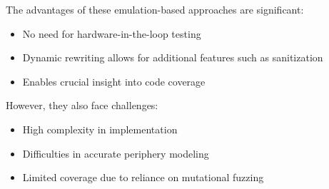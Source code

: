 The advantages of these emulation-based approaches are significant:
\begin{itemize}
  \item No need for hardware-in-the-loop testing
  \item Dynamic rewriting allows for additional features such as sanitization
  \item Enables crucial insight into code coverage
\end{itemize}

However, they also face challenges:
\begin{itemize}
  \item High complexity in implementation
  \item Difficulties in accurate periphery modeling
  \item Limited coverage due to reliance on mutational fuzzing
\end{itemize}
